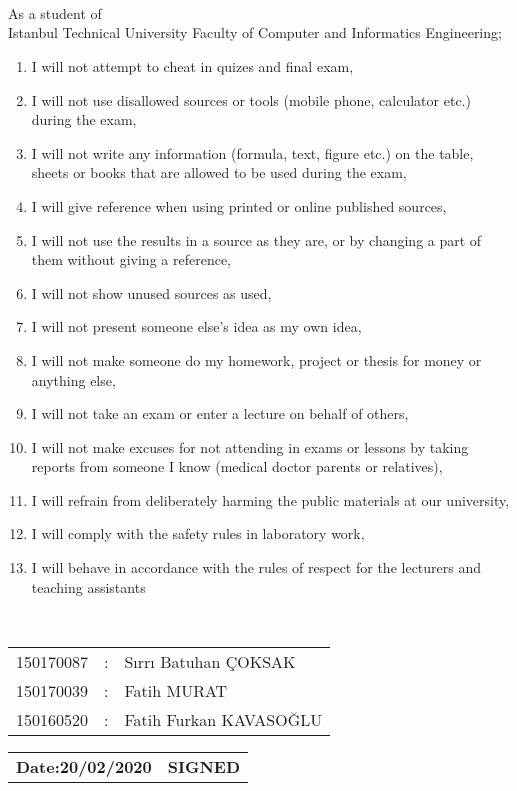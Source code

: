 
\thispagestyle{empty}
\\
\\
\\[0.2cm]
As a student of \\Istanbul Technical University Faculty of Computer and Informatics Engineering;
\begin{enumerate}
    \item I will not attempt to cheat in quizes and final exam,
    \item I will not use disallowed sources or tools (mobile phone, calculator etc.) during the exam,
    \item I will not write any information (formula, text, figure etc.) on the table, sheets or books that are allowed to be used during the exam,
    \item I will give reference when using printed or online published sources,
    \item I will not use the results in a source as they are, or by changing a part of them without giving a reference,
    \item I will not show unused sources as used, 
    \item I will not present someone else’s idea as my own idea, 
    \item I will not make someone do my homework, project or thesis for money or anything else,
    \item I will not take an exam or enter a lecture on behalf of others,
    \item I will not make excuses for not attending in exams or lessons by taking reports from someone I know (medical doctor parents or relatives),
    \item I will refrain from deliberately harming the public materials at our university,  
    \item I will comply with the safety rules in laboratory work,
    \item I will behave in accordance with the rules of respect for the lecturers and teaching assistants
\end{enumerate}
\vspace{-1em}
\\
\vspace{-1em}
\begin{table}[ht]
\centering
\begin{tabular}{rcl}
150170087  & : & Sırrı Batuhan ÇOKSAK \\
150170039  & : & Fatih MURAT \\
150160520  & : & Fatih Furkan KAVASOĞLU \\
\end{tabular}
\end{table}
\vspace{-1em}
 \begin{table}[ht]
 \begin{tabular}{lr}
\textbf{Date:\hspace*{0.3cm}20\hspace*{0.3cm}/\hspace*{0.3cm}02\hspace*{0.3cm}/\hspace*{0.3cm}2020} &\qquad \qquad\qquad\qquad \qquad\qquad\qquad \qquad\qquad\qquad \textbf{SIGNED}\\
\end{tabular}
\end{table}